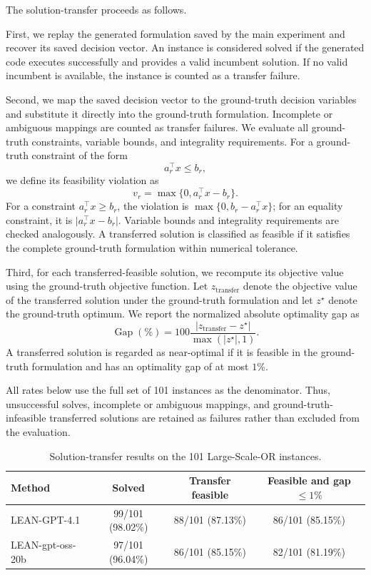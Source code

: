 \documentclass[11pt]{article}
\begin{document}
\begin{enumerate}[label=(R1.Major.\arabic*),leftmargin=*]
The solution-transfer proceeds as follows.

First, we replay the generated formulation saved by the main experiment and recover its saved decision vector. An instance is considered solved if the generated code executes successfully and provides a valid incumbent solution. If no valid incumbent is available, the instance is counted as a transfer failure.

Second, we map the saved decision vector to the ground-truth decision variables and substitute it directly into the ground-truth formulation. Incomplete or ambiguous mappings are counted as transfer failures. We evaluate all ground-truth constraints, variable bounds, and integrality requirements. For a ground-truth constraint of the form
\[
a_r^\top x \leq b_r,
\]
we define its feasibility violation as
\[
v_r=\max\{0,a_r^\top x-b_r\}.
\]
For a constraint $a_r^\top x\geq b_r$, the violation is
$\max\{0,b_r-a_r^\top x\}$; for an equality constraint, it is
$\lvert a_r^\top x-b_r\rvert$.
Variable bounds and integrality requirements are checked analogously. A transferred solution is classified as feasible if it satisfies the complete ground-truth formulation within numerical tolerance.

Third, for each transferred-feasible solution, we recompute its objective value using the ground-truth objective function. Let $z_{\mathrm{transfer}}$ denote the objective value of the transferred solution under the ground-truth formulation and let $z^\star$ denote the ground-truth optimum. We report the normalized absolute optimality gap as
\[
\operatorname{Gap}(\%)
=
100
\frac{
\left|z_{\mathrm{transfer}}-z^\star\right|
}{
\max\left(\left|z^\star\right|,1\right)
}.
\]
A transferred solution is regarded as near-optimal if it is feasible in the ground-truth formulation and has an optimality gap of at most $1\%$.

All rates below use the full set of 101 instances as the denominator. Thus, unsuccessful solves, incomplete or ambiguous mappings, and ground-truth-infeasible transferred solutions are retained as failures rather than excluded from the evaluation.

\begin{table}[!htbp]
\centering
\caption{Solution-transfer results on the 101 Large-Scale-OR instances.}
\label{tab:solution_transfer}
\begin{tabular}{lccc}
\toprule
Method
& Solved
& Transfer feasible
& Feasible and gap $\leq 1\%$ \\
\midrule
LEAN-GPT-4.1
& 99/101 (98.02\%)
& 88/101 (87.13\%)
& 86/101 (85.15\%) \\
LEAN-gpt-oss-20b
& 97/101 (96.04\%)
& 86/101 (85.15\%)
& 82/101 (81.19\%) \\
\bottomrule
\end{tabular}
\end{table}








\end{enumerate}
\end{document}

